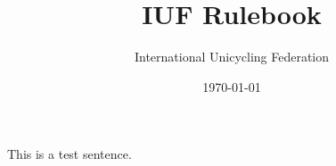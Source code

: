 \documentclass[a4paper,oneside]{scrbook}
\title{IUF Rulebook}
\author{International Unicycling Federation}
\date{\today}
\begin{document}
\maketitle

\doparttoc
\tableofcontents



This is a test sentence.
\end{document}
